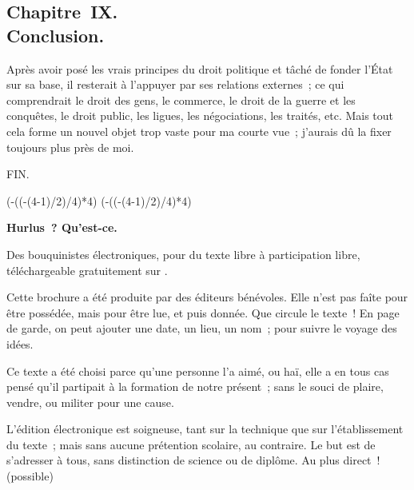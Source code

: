 \documentclass[french,twoside]{book} %
\def\truncdiv#1#2{((#1-(#2-1)/2)/#2)}
\def\moduloop#1#2{(#1-\truncdiv{#1}{#2}*#2)}
\def\modulo#1#2{\number\numexpr\moduloop{#1}{#2}\relax}
\begin{document}
\subsection[{Chapitre IX. Conclusion.}]{Chapitre IX. \\
Conclusion.}
\noindent Après avoir posé les vrais principes du droit politique et tâché de fonder l’État sur sa base, il resterait à l’appuyer par ses relations externes ; ce qui comprendrait le droit des gens, le commerce, le droit de la guerre et les conquêtes, le droit public, les ligues, les négociations, les traités, etc. Mais tout cela forme un nouvel objet trop vaste pour ma courte vue ; j’aurais dû la fixer toujours plus près de moi.\par


\begin{raggedleft}FIN.\end{raggedleft}
 


\ifbooklet
  \pagestyle{empty}
  \clearpage
  \ifnum\modulo{\value{page}}{4}=0 \hbox{}\newpage\hbox{}\newpage\fi
  \ifnum\modulo{\value{page}}{4}=1 \hbox{}\newpage\hbox{}\newpage\fi


  \hbox{}\newpage
  \ifodd\value{page}\hbox{}\newpage\fi
  {\centering\color{rubric}\bfseries\noindent\large
    Hurlus ? Qu’est-ce.\par
    \bigskip
  }
  \noindent Des bouquinistes électroniques, pour du texte libre à participation libre,
  téléchargeable gratuitement sur \href{https://hurlus.fr}{}.\par
  \bigskip
  \noindent Cette brochure a été produite par des éditeurs bénévoles.
  Elle n’est pas faîte pour être possédée, mais pour être lue, et puis donnée.
  Que circule le texte !
  En page de garde, on peut ajouter une date, un lieu, un nom ; pour suivre le voyage des idées.
  \par

  Ce texte a été choisi parce qu’une personne l’a aimé,
  ou haï, elle a en tous cas pensé qu’il partipait à la formation de notre présent ;
  sans le souci de plaire, vendre, ou militer pour une cause.
  \par

  L’édition électronique est soigneuse, tant sur la technique
  que sur l’établissement du texte ; mais sans aucune prétention scolaire, au contraire.
  Le but est de s’adresser à tous, sans distinction de science ou de diplôme.
  Au plus direct ! (possible)
  \par
\end{document}
